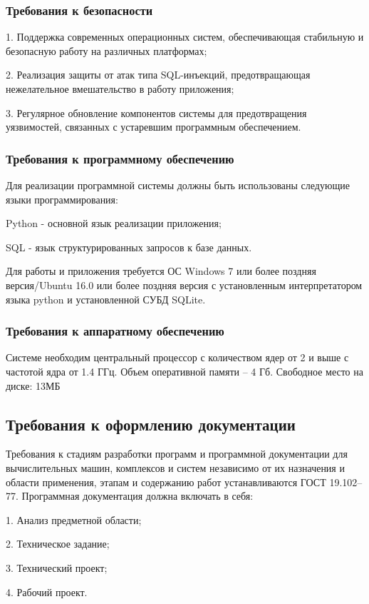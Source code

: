 \subsubsection{Требования к безопасности}
1. Поддержка современных операционных систем, обеспечивающая стабильную и безопасную работу на различных платформах;

2. Реализация защиты от атак типа SQL-инъекций, предотвращающая нежелательное вмешательство в работу приложения;

3. Регулярное обновление компонентов системы для предотвращения уязвимостей, связанных с устаревшим программным обеспечением.

\subsubsection{Требования к программному обеспечению}
Для реализации программной системы должны быть использованы следующие языки программирования: 

Python - основной язык реализации приложения; 

SQL - язык структурированных запросов к базе данных.

Для работы и приложения требуется ОС Windows 7 или более поздняя версия/Ubuntu 16.0 или более поздняя версия с установленным интерпретатором языка python и установленной СУБД SQLite.

\subsubsection{Требования к аппаратному обеспечению}
Системе необходим центральный процессор с количеством ядер от 2 и выше с частотой ядра от 1.4 ГГц. Объем оперативной памяти – 4 Гб.
Свободное место на диске: 13МБ

\subsection{Требования к оформлению документации}

Требования к стадиям разработки программ и программной документации для вычислительных машин, комплексов и систем независимо от их
назначения и области применения, этапам и содержанию работ устанавливаются ГОСТ 19.102–77. Программная документация должна включать в себя:

1. Анализ предметной области;

2. Техническое задание;

3. Технический проект;

4. Рабочий проект.

